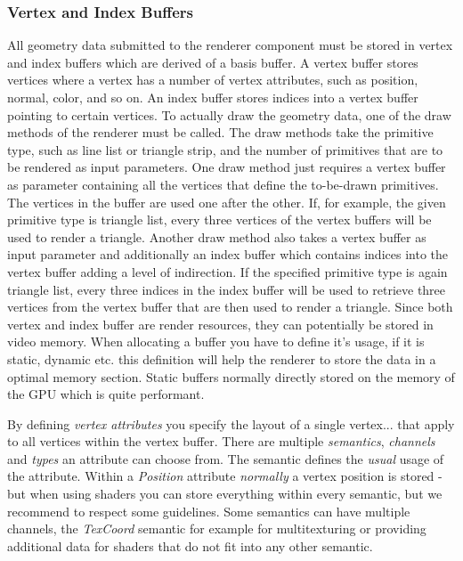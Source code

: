 \subsubsection{Vertex and Index Buffers}
All geometry data submitted to the renderer component must be stored in vertex and index buffers which are derived of a basis buffer. A vertex buffer stores vertices where a vertex has a number of vertex attributes, such as position, normal, color, and so on. An index buffer stores indices into a vertex buffer pointing to certain vertices. To actually draw the geometry data, one of the draw methods of the renderer must be called. The draw methods take the primitive type, such as line list or triangle strip, and the number of primitives that are to be rendered as input parameters. One draw method just requires a vertex buffer as parameter containing all the vertices that define the to-be-drawn primitives. The vertices in the buffer are used one after the other. If, for example, the given primitive type is triangle list, every three vertices of the vertex buffers will be used to render a triangle. Another draw method also takes a vertex buffer as input parameter and additionally an index buffer which contains indices into the vertex buffer adding a level of indirection. If the specified primitive type is again triangle list, every three indices in the index buffer will be used to retrieve three vertices from the vertex buffer that are then used to render a triangle. Since both vertex and index buffer are render resources, they can potentially be stored in video memory. When allocating a buffer you have to define it's usage, if it is static, dynamic etc. this definition will help the renderer to store the data in a optimal memory section. Static buffers normally directly stored on the 
memory of the GPU which is quite performant.

By defining \emph{vertex attributes} you specify the layout of a single vertex... that apply to all vertices within the vertex buffer. There are multiple \emph{semantics}, \emph{channels} and \emph{types} an attribute can choose from. The semantic defines the \emph{usual} usage of the attribute. Within a \emph{Position} attribute \emph{normally} a vertex position is stored - but when using shaders you can store everything within every semantic, but we recommend to respect some guidelines. Some semantics can have multiple channels, the \emph{TexCoord} semantic for example for multitexturing or providing additional data for shaders that do not fit into any other semantic.

